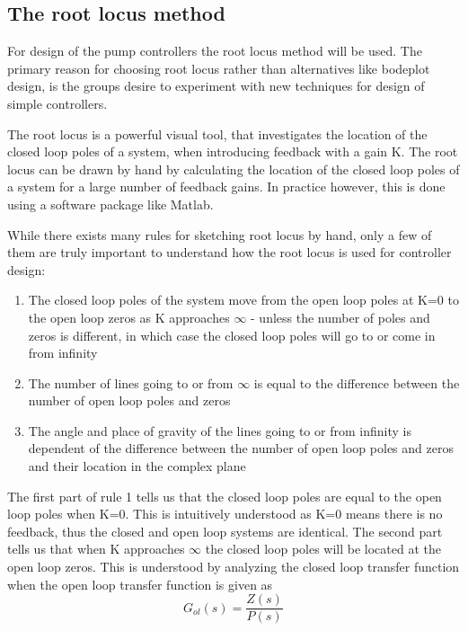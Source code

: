 \subsection{The root locus method}

For design of the pump controllers the root locus method will be used. The primary reason for choosing root locus rather than alternatives like bodeplot design, is the groups desire to experiment with new techniques for design of simple controllers.

The root locus is a powerful visual tool, that investigates the location of the closed loop poles of a system, when introducing feedback with a gain K. The root locus can be drawn by hand by calculating the location of the closed loop poles of a system for a large number of feedback gains. In practice however, this is done using a software package like Matlab.

While there exists many rules for sketching root locus by hand, only a few of them are truly important to understand how the root locus is used for controller design:

\begin{enumerate}
	\item The closed loop poles of the system move from the open loop poles at K=0 to the open loop zeros as K approaches $\infty$ - unless the number of poles and zeros is different, in which case the closed loop poles will go to or come in from infinity
	\item The number of lines going to or from $\infty$ is equal to the difference between the number of open loop poles and zeros
	\item The angle and place of gravity of the lines going to or from infinity is dependent of the difference between the number of open loop poles and zeros and their location in the complex plane
\end{enumerate}

The first part of rule 1 tells us that the closed loop poles are equal to the open loop poles when K=0. This is intuitively understood as K=0 means there is no feedback, thus the closed and open loop systems are identical. The second part tells us that when K approaches $\infty$ the closed loop poles will be located at the open loop zeros. This is understood by analyzing the closed loop transfer function when the open loop transfer function is given as
\begin{equation}
	G_{ol}(s) = \frac{Z(s)}{P(s)}
\end{equation}

